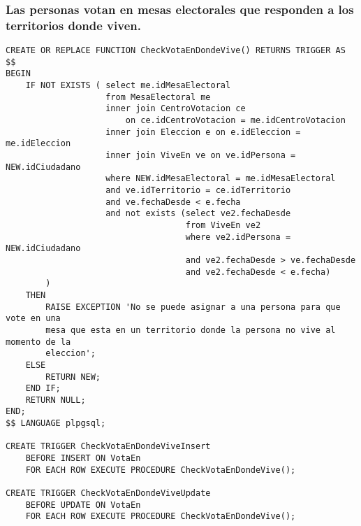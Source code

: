 \subsubsection{Las personas votan en mesas electorales que responden a los territorios donde viven.}
\begin{verbatim}
CREATE OR REPLACE FUNCTION CheckVotaEnDondeVive() RETURNS TRIGGER AS $$
BEGIN
    IF NOT EXISTS ( select me.idMesaElectoral
                    from MesaElectoral me
                    inner join CentroVotacion ce 
                        on ce.idCentroVotacion = me.idCentroVotacion
                    inner join Eleccion e on e.idEleccion = me.idEleccion
                    inner join ViveEn ve on ve.idPersona = NEW.idCiudadano
                    where NEW.idMesaElectoral = me.idMesaElectoral
                    and ve.idTerritorio = ce.idTerritorio
                    and ve.fechaDesde < e.fecha
                    and not exists (select ve2.fechaDesde
                                    from ViveEn ve2
                                    where ve2.idPersona = NEW.idCiudadano
                                    and ve2.fechaDesde > ve.fechaDesde 
                                    and ve2.fechaDesde < e.fecha)
        )
    THEN
        RAISE EXCEPTION 'No se puede asignar a una persona para que vote en una 
        mesa que esta en un territorio donde la persona no vive al momento de la 
        eleccion';
    ELSE
        RETURN NEW;
    END IF;
    RETURN NULL;
END;
$$ LANGUAGE plpgsql;

CREATE TRIGGER CheckVotaEnDondeViveInsert
    BEFORE INSERT ON VotaEn
    FOR EACH ROW EXECUTE PROCEDURE CheckVotaEnDondeVive();
    
CREATE TRIGGER CheckVotaEnDondeViveUpdate
    BEFORE UPDATE ON VotaEn
    FOR EACH ROW EXECUTE PROCEDURE CheckVotaEnDondeVive();

\end{verbatim}

